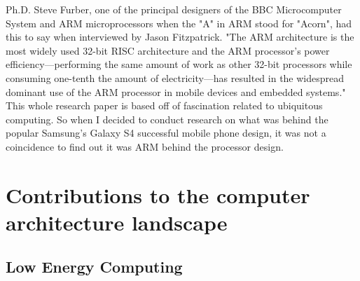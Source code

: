 \documentclass[12pt]{scrreprt}
\begin{document}
	Ph.D. Steve Furber, one of the principal designers of the BBC Microcomputer System and ARM microprocessors when the "A" in ARM stood for 
	"Acorn", had this to say when interviewed by Jason Fitzpatrick. "The ARM architecture is the most widely used 32-bit RISC architecture and the ARM processor's power efficiency—performing the same amount of work as other 32-bit processors while consuming one-tenth the amount of electricity—has resulted in the widespread dominant use of the ARM processor in mobile devices and embedded systems." This whole research paper is based off of fascination related to ubiquitous computing. So when I decided to conduct research on what was behind the popular Samsung's Galaxy S4 successful mobile phone design, it was not a coincidence to find out it was ARM behind the processor design.


\chapter{Contributions to the computer architecture landscape}

	\section{Low Energy Computing}
\end{document}
